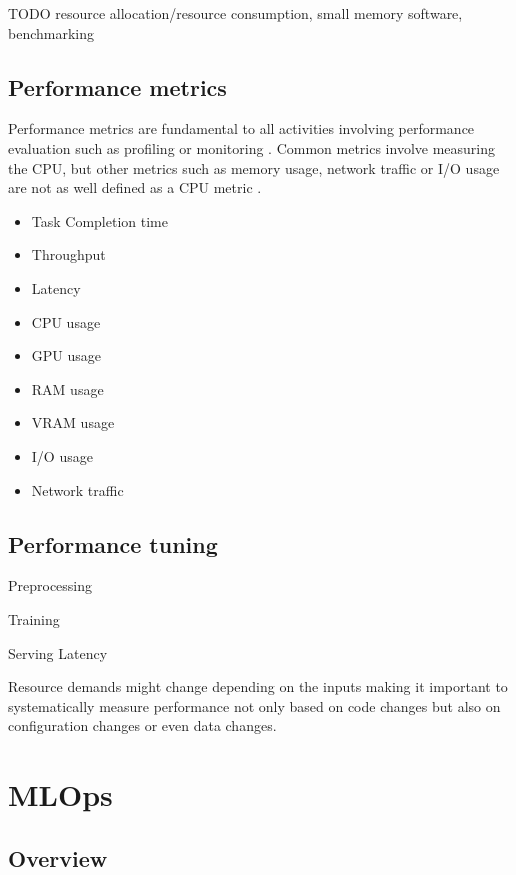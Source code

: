 TODO resource allocation/resource consumption, small memory software, benchmarking

\subsection{Performance metrics}

Performance metrics are fundamental to all activities involving performance evaluation such as profiling or monitoring \parencite{brunnertPerformanceorientedDevOpsResearch2015}. Common metrics involve measuring the CPU, but other metrics such as memory usage, network traffic or I/O usage are not as well defined as a CPU metric \parencite{brunnertPerformanceorientedDevOpsResearch2015}. 

\begin{itemize}
    \item Task Completion time
    \item Throughput
    \item Latency
    \item CPU usage
    \item GPU usage
    \item RAM usage
    \item VRAM usage
    \item I/O usage
    \item Network traffic
\end{itemize}

\subsection{Performance tuning}

Preprocessing

Training

Serving Latency

Resource demands might change depending on the inputs \parencite{brunnertPerformanceorientedDevOpsResearch2015} making it important to systematically measure performance not only based on code changes but also on configuration changes or even data changes.

\section{MLOps}
\label{sec:mldevops}

\subsection{Overview}

